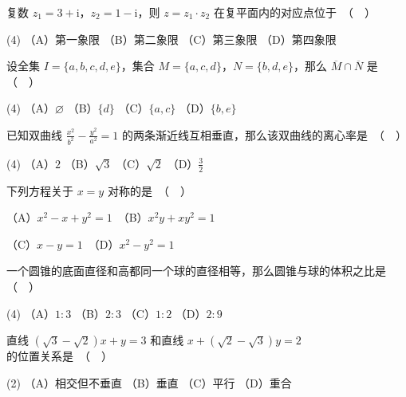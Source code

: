 \begin{question}
复数 $z_1 = 3 + \mathrm{i}$，$z_2 = 1 - \mathrm{i}$，则 $z = z_1 \cdot z_2$ 在复平面内的对应点位于　（　）

\begin{gkopts}(4)
\task （A）第一象限
\task （B）第二象限
\task （C）第三象限
\task （D）第四象限
\end{gkopts}

\end{question}
\begin{question}
设全集 $I = \{a, b, c, d, e\}$，集合 $M = \{a, c, d\}$，$N = \{b, d, e\}$，那么 $\overline{M} \cap \overline{N}$ 是　（　）

\begin{gkopts}(4)
\task （A）$\varnothing$
\task （B）$\{d\}$
\task （C）$\{a, c\}$
\task （D）$\{b, e\}$
\end{gkopts}

\end{question}
\begin{question}
已知双曲线 $\frac{x^2}{b^2} - \frac{y^2}{a^2} = 1$ 的两条渐近线互相垂直，那么该双曲线的离心率是　（　）

\begin{gkopts}(4)
\task （A）$2$
\task （B）$\sqrt{3}$
\task （C）$\sqrt{2}$
\task （D）$\frac{3}{2}$
\end{gkopts}

\end{question}
\begin{question}
下列方程关于 $x = y$ 对称的是　（　）

（A）$x^2 - x + y^2 = 1$　（B）$x^2 y + x y^2 = 1$

（C）$x - y = 1$　（D）$x^2 - y^2 = 1$

\end{question}
\begin{question}
一个圆锥的底面直径和高都同一个球的直径相等，那么圆锥与球的体积之比是　（　）

\begin{gkopts}(4)
\task （A）$1:3$
\task （B）$2:3$
\task （C）$1:2$
\task （D）$2:9$
\end{gkopts}

\end{question}
\begin{question}
直线 $(\sqrt{3} - \sqrt{2})x + y = 3$ 和直线 $x + (\sqrt{2} - \sqrt{3})y = 2$ 的位置关系是　（　）

\begin{gkopts}(2)
\task （A）相交但不垂直
\task （B）垂直
\task （C）平行
\task （D）重合
\end{gkopts}

\end{question}
